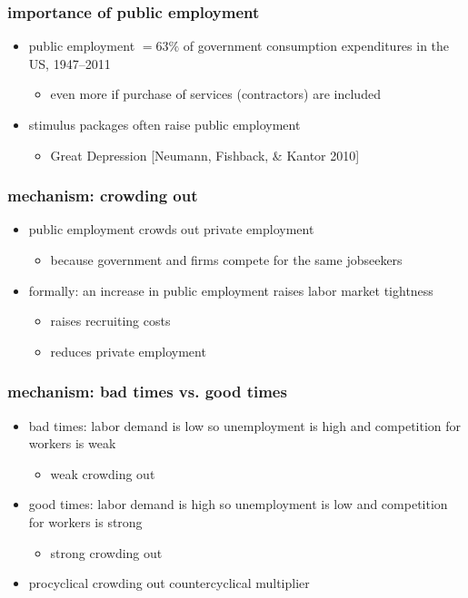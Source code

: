 \documentclass[12pt,xcolor={dvipsnames},hyperref={pdftex,pdfpagemode=UseNone,hidelinks,pdfdisplaydoctitle=true},usepdftitle=false]{beamer}
\begin{document}
\begin{frame}
\frametitle{importance of public employment}
\begin{itemize}
\item public employment $= 63\%$ of government consumption expenditures in the US, 1947--2011
\begin{itemize}
\item even more if purchase of services (contractors) are included
\end{itemize}
\item stimulus packages often raise public employment
\begin{itemize}
\item Great Depression [Neumann, Fishback, \& Kantor 2010]
\end{itemize} 
\end{itemize}
\end{frame}

\begin{frame}
\frametitle{mechanism: crowding out}
\begin{itemize}
\item public employment crowds out private employment
\begin{itemize}
\item because government and firms compete for the same jobseekers
\end{itemize}
\item formally: an increase in public employment raises labor market tightness
\begin{itemize}
\item[\then] raises recruiting costs
\item[\then] reduces private employment
\end{itemize}
\end{itemize}
\end{frame}

\begin{frame}
\frametitle{mechanism: bad times vs. good times}
\begin{itemize}
\item bad times: labor demand is low so unemployment is high and competition for workers is weak
\begin{itemize}
\item[\then] weak crowding out
\end{itemize}
\item good times: labor demand is high so unemployment is low and competition for workers is strong
\begin{itemize}
\item[\then] strong crowding out
\end{itemize}
\item procyclical crowding out \then countercyclical multiplier
\end{itemize}
\end{frame}
\end{document}
